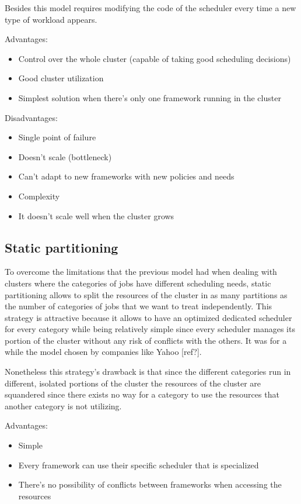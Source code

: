 \documentclass{svjour3}                     %
\begin{document}
Besides this model requires modifying the code of the scheduler every
time a new type of workload appears. 

Advantages:

\begin{itemize}
  \item Control over the whole cluster (capable of taking good scheduling decisions)
  \item Good cluster utilization
  \item Simplest solution when there's only one framework running in the cluster
\end{itemize}

Disadvantages:

\begin{itemize}
  \item Single point of failure
  \item Doesn't scale (bottleneck)
  \item Can't adapt to new frameworks with new policies and needs
  \item Complexity
  \item It doesn't scale well when the cluster grows
\end{itemize}

\subsection{Static partitioning}

To overcome the limitations that the previous model had when dealing
with clusters where the categories of jobs have different scheduling
needs, static partitioning allows to split the resources of the cluster
in as many partitions as the number of categories of jobs that we want to
treat independently. This strategy is attractive because it allows to
have an optimized dedicated scheduler for every category while being
relatively simple since every scheduler manages its portion of the
cluster without any risk of conflicts with the others. It was
for a while the model chosen by companies like Yahoo [ref?].

Nonetheless this strategy's drawback is that since the different 
categories run in different, isolated portions of the cluster the
resources of the cluster are squandered since there exists no way for
a category to use the resources that another category is not utilizing.

Advantages:

\begin{itemize}
    \item Simple
    \item Every framework can use their specific scheduler that is specialized
    \item There's no possibility of conflicts between frameworks when
      accessing the resources
\end{itemize}
\end{document}
